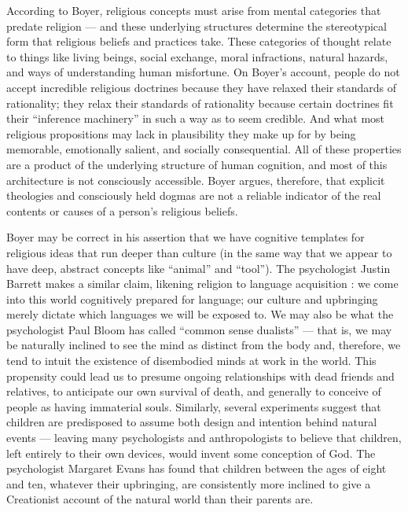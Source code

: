 \documentclass[a4paper,14pt]{extarticle}
\begin{document}
According to Boyer, religious concepts must arise from mental categories that predate religion --- and these underlying structures determine the stereotypical form that religious beliefs and practices take.
These categories of thought relate to things like living beings, social exchange, moral infractions, natural hazards, and ways of understanding human misfortune.
On Boyer’s account, people do not accept incredible religious doctrines because they have relaxed their standards of rationality;
they relax their standards of rationality because certain doctrines fit their ``inference machinery'' in such a way as to seem credible.
And what most religious propositions may lack in plausibility they make up for by being memorable, emotionally salient, and socially consequential.
All of these properties are a product of the underlying structure of human cognition, and most of this architecture is not consciously accessible.
Boyer argues, therefore, that explicit theologies and consciously held dogmas are not a reliable indicator of the real contents or causes of a person’s religious beliefs.

Boyer may be correct in his assertion that we have cognitive templates for religious ideas that run deeper than culture (in the same way that we appear to have deep, abstract concepts like ``animal'' and ``tool'').
The psychologist Justin Barrett makes a similar claim, likening religion to language acquisition :
we come into this world cognitively prepared for language;
our culture and upbringing merely dictate which languages we will be exposed to.
We may also be what the psychologist Paul Bloom has called ``common sense dualists'' --- that is, we may be naturally inclined to see the mind as distinct from the body and, therefore, we tend to intuit the existence of disembodied minds at work in the world.
This propensity could lead us to presume ongoing relationships with dead friends and relatives, to anticipate our own survival of death, and generally to conceive of people as having immaterial souls.
Similarly, several experiments suggest that children are predisposed to assume both design and intention behind natural events --- leaving many psychologists and anthropologists to believe that children, left entirely to their own devices, would invent some conception of God.
The psychologist Margaret Evans has found that children between the ages of eight and ten, whatever their upbringing, are consistently more inclined to give a Creationist account of the natural world than their parents are.
\end{document}
